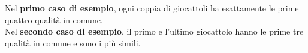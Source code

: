 

\Examples
\begin{example}
%
%
\end{example}


\Explanation
Nel \textbf{primo caso di esempio}, ogni coppia di giocattoli ha esattamente le prime quattro qualit\`a in comune.\\[2mm]
Nel \textbf{secondo caso di esempio}, il primo e l'ultimo giocattolo hanno le prime tre qualit\`a in comune e sono i pi\`u simili.
